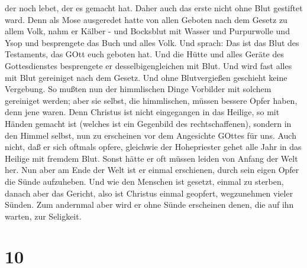 der noch lebet, der es gemacht hat.  Daher auch das erste
nicht ohne Blut gestiftet ward.  Denn als Mose ausgeredet
hatte von allen Geboten nach dem Gesetz zu allem Volk, nahm er Kälber -
und Bocksblut mit Wasser und Purpurwolle und Ysop und besprengete das
Buch und alles Volk.  Und sprach: Das ist das Blut des
Testaments, das GOtt euch geboten hat.  Und die Hütte und
alles Geräte des Gottesdienstes besprengete er desselbigengleichen mit
Blut.  Und wird fast alles mit Blut gereiniget nach dem
Gesetz. Und ohne Blutvergießen geschieht keine Vergebung. 
So mußten nun der himmlischen Dinge Vorbilder mit solchem gereiniget
werden; aber sie selbst, die himmlischen, müssen bessere Opfer haben,
denn jene waren.  Denn Christus ist nicht eingegangen in
das Heilige, so mit Händen gemacht ist (welches ist ein Gegenbild des
rechtschaffenen), sondern in den Himmel selbst, nun zu erscheinen vor
dem Angesichte GOttes für uns.  Auch nicht, daß er sich
oftmals opfere, gleichwie der Hohepriester gehet alle Jahr in das
Heilige mit fremdem Blut.  Sonst hätte er oft müssen leiden
von Anfang der Welt her. Nun aber am Ende der Welt ist er einmal
erschienen, durch sein eigen Opfer die Sünde aufzuheben. 
Und wie den Menschen ist gesetzt, einmal zu sterben, danach aber das
Gericht,  also ist Christus einmal geopfert, wegzunehmen
vieler Sünden. Zum andernmal aber wird er ohne Sünde erscheinen denen,
die auf ihn warten, zur Seligkeit.

\hypertarget{section-8}{%
\section{10}\label{section-8}}


